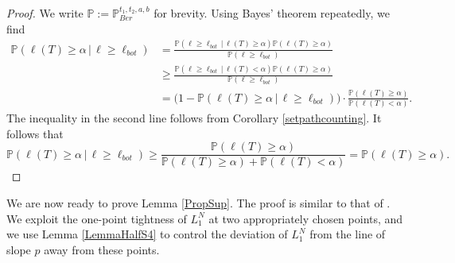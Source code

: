 \begin{proof}
	We write $\mathbb{P} := \mathbb{P}^{t_1,t_2,a,b}_{Ber}$ for brevity. Using Bayes' theorem repeatedly, we find
	\begin{align*}
	\mathbb{P}(\ell(T)\geq\alpha\,|\,\ell \geq \ell_{bot}) &= \frac{\mathbb{P}(\ell \geq \ell_{bot}\,|\,\ell(T)\geq\alpha) \mathbb{P}(\ell(T)\geq\alpha)}{\mathbb{P}(\ell \geq \ell_{bot})}\\ 
	&\geq \frac{\mathbb{P}(\ell \geq \ell_{bot}\,|\,\ell(T) < \alpha) \mathbb{P}(\ell(T)\geq\alpha)}{\mathbb{P}(\ell \geq \ell_{bot})}\\
	&= \big(1 - \mathbb{P}(\ell(T)\geq\alpha\,|\,\ell \geq \ell_{bot})\big)\cdot\frac{\mathbb{P}(\ell(T)\geq\alpha)}{\mathbb{P}(\ell(T) < \alpha)}.
	\end{align*}
	The inequality in the second line follows from Corollary \ref{setpathcounting}. It follows that
	\[
	\mathbb{P}(\ell(T)\geq\alpha\,|\,\ell \geq \ell_{bot}) \geq \frac{\mathbb{P}(\ell(T)\geq\alpha)}{\mathbb{P}(\ell(T)\geq\alpha) + \mathbb{P}(\ell(T) < \alpha)} = \mathbb{P}(\ell(T)\geq\alpha).
	\]
\end{proof}

We are now ready to prove Lemma \ref{PropSup}. The proof is similar to that of \cite[Lemma 5.2]{CD}. We exploit the one-point tightness of $L_1^N$ at two appropriately chosen points, and we use Lemma \ref{LemmaHalfS4} to control the deviation of $L_1^N$ from the line of slope $p$ away from these points.

